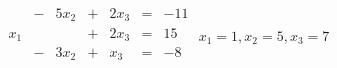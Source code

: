 {$\begin{array}{*{7}{r}}
&-&5x_2&+&2x_3&=&-11\\
x_1&&&+&2x_3&=&15\\
&-&3x_2&+&x_3&=&-8\\
\end{array}$}
{$x_1=1,x_2=5,x_3=7$}
